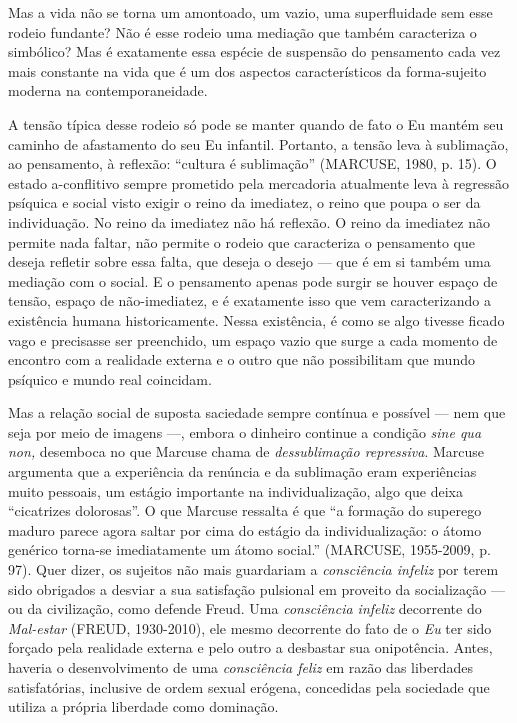 Mas a vida não se torna um amontoado, um vazio, uma superfluidade sem
esse rodeio fundante? Não é esse rodeio uma mediação que também
caracteriza o simbólico? Mas é exatamente essa espécie de suspensão do
pensamento cada vez mais constante na vida que é um dos aspectos
característicos da forma-sujeito moderna na contemporaneidade.

A tensão típica desse rodeio só pode se manter quando de fato o Eu
mantém seu caminho de afastamento do seu Eu infantil. Portanto, a tensão
leva à sublimação, ao pensamento, à reflexão: ``cultura é sublimação''
(MARCUSE, 1980, p. 15). O estado a-conflitivo sempre prometido pela
mercadoria atualmente leva à regressão psíquica e social visto exigir o
reino da imediatez, o reino que poupa o ser da individuação. No reino da
imediatez não há reflexão. O reino da imediatez não permite nada faltar,
não permite o rodeio que caracteriza o pensamento que deseja refletir
sobre essa falta, que deseja o desejo --- que é em si também uma
mediação com o social. E o pensamento apenas pode surgir se houver
espaço de tensão, espaço de não-imediatez, e é exatamente isso que vem
caracterizando a existência humana historicamente. Nessa existência, é
como se algo tivesse ficado vago e precisasse ser preenchido, um espaço
vazio que surge a cada momento de encontro com a realidade externa e o
outro que não possibilitam que mundo psíquico e mundo real coincidam.

Mas a relação social de suposta saciedade sempre contínua e possível ---
nem que seja por meio de imagens ---, embora o dinheiro continue a
condição \emph{sine qua non,} desemboca no que Marcuse chama de
\emph{dessublimação repressiva}. Marcuse argumenta que a experiência da
renúncia e da sublimação eram experiências muito pessoais, um estágio
importante na individualização, algo que deixa ``cicatrizes dolorosas''.
O que Marcuse ressalta é que ``a formação do superego maduro parece
agora saltar por cima do estágio da individualização: o átomo genérico
torna-se imediatamente um átomo social.'' (MARCUSE, 1955-2009, p. 97).
Quer dizer, os sujeitos não mais guardariam a \emph{consciência infeliz}
por terem sido obrigados a desviar a sua satisfação pulsional em
proveito da socialização --- ou da civilização, como defende Freud. Uma
\emph{consciência infeliz} decorrente do \emph{Mal-estar} (FREUD,
1930-2010), ele mesmo decorrente do fato de o \emph{Eu} ter sido forçado
pela realidade externa e pelo outro a desbastar sua onipotência. Antes,
haveria o desenvolvimento de uma \emph{consciência feliz} em razão das
liberdades satisfatórias, inclusive de ordem sexual erógena, concedidas
pela sociedade que utiliza a própria liberdade como dominação.

